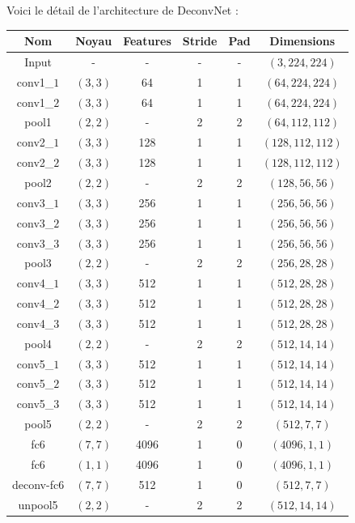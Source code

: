 \documentclass[a4paper, 11pt]{report}
\begin{document}
Voici le détail de l'architecture de DeconvNet :
\begin{center}
	\begin{tabular}{|c|c|c|c|c|c|}
	\hline 
	Nom & Noyau & Features & Stride & Pad & Dimensions \\ 
	\hline 
	Input & - & - & - & - & $(3, 224, 224)$\\ 
	\hline 
	conv1\_$1$ & $(3, 3)$ & 64 & 1 & 1 & $(64, 224, 224)$ \\
	\hline 
	conv1\_$2$ & $(3, 3)$ & 64 & 1 & 1 & $(64, 224, 224)$ \\
	\hline 
	pool1 & $(2, 2)$ & - & 2 & 2 & $(64, 112, 112)$ \\
	\hline 
	conv2\_$1$ & $(3, 3)$ & 128 & 1 & 1 & $(128, 112, 112)$ \\
	\hline 
	conv2\_$2$ & $(3, 3)$ & 128 & 1 & 1 & $(128, 112, 112)$ \\
	\hline 
	pool2 & $(2, 2)$ & - & 2 & 2 & $(128, 56, 56)$ \\
	\hline 
	conv3\_$1$ & $(3, 3)$ & 256 & 1 & 1 & $(256, 56, 56)$ \\
	\hline 
	conv3\_$2$ & $(3, 3)$ & 256 & 1 & 1 & $(256, 56, 56)$ \\
	\hline 
	conv3\_$3$ & $(3, 3)$ & 256 & 1 & 1 & $(256, 56, 56)$ \\
	\hline 
	pool3 & $(2, 2)$ & - & 2 & 2 & $(256, 28, 28)$ \\
	\hline 
	conv4\_$1$ & $(3, 3)$ & 512 & 1 & 1 & $(512, 28, 28)$ \\
	\hline 
	conv4\_$2$ & $(3, 3)$ & 512 & 1 & 1 & $(512, 28, 28)$ \\
	\hline 
	conv4\_$3$ & $(3, 3)$ & 512 & 1 & 1 & $(512, 28, 28)$ \\
	\hline 
	pool4 & $(2, 2)$ & - & 2 & 2 & $(512, 14, 14)$ \\
	\hline 
	conv5\_$1$ & $(3, 3)$ & 512 & 1 & 1 & $(512, 14, 14)$ \\
	\hline
	conv5\_$2$ & $(3, 3)$ & 512 & 1 & 1 & $(512, 14, 14)$ \\
	\hline
	conv5\_$3$ & $(3, 3)$ & 512 & 1 & 1 & $(512, 14, 14)$ \\
	\hline
	pool5 & $(2, 2)$ & - & 2 & 2 & $(512, 7, 7)$ \\
	\hline
	fc6 & $(7, 7)$ & 4096 & 1 & 0 & $(4096, 1, 1)$ \\
	\hline
	fc6 & $(1, 1)$ & 4096 & 1 & 0 & $(4096, 1, 1)$ \\
	\hline
	deconv-fc6 & $(7, 7)$ & 512 & 1 & 0 & $(512, 7, 7)$ \\
	\hline
	unpool5 & $(2, 2)$ & - & 2 & 2 & $(512, 14, 14)$ \\

\end{tabular}
\end{center}
\end{document}
